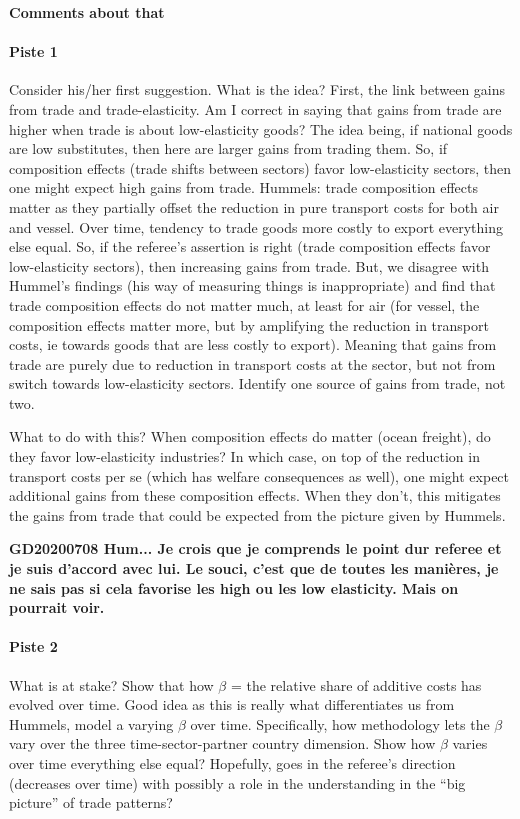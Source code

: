 \documentclass[a4paper,12pt]{article}
\begin{document}
\textbf{Comments about that}

\paragraph{Piste 1} Consider his/her first suggestion. What is the idea? First, the link between gains from trade and trade-elasticity. Am I correct in saying that gains from trade are higher when trade is about low-elasticity goods? The idea being, if national goods are low substitutes, then here are larger gains from trading them. So, if composition effects (trade shifts between sectors) favor low-elasticity sectors, then one might expect high gains from trade. Hummels: trade composition effects matter as they partially offset the reduction in pure transport costs for both air and vessel. Over time, tendency to trade goods more costly to export everything else equal. So, if the referee's assertion is right (trade composition effects favor low-elasticity sectors), then increasing gains from trade. But, we disagree with Hummel's findings (his way of measuring things is inappropriate) and find that trade composition effects do not matter much, at least for air (for vessel, the composition effects matter more, but by amplifying the reduction in transport costs, ie towards goods that are less costly to export). Meaning that gains from trade are purely due to reduction in transport costs at the sector, but not from switch towards low-elasticity sectors. Identify one source of gains from trade, not two.

What to do with this? When composition effects do matter (ocean freight), do they favor low-elasticity industries? In which case, on top of the reduction in transport costs per se (which has welfare consequences as well), one might expect additional gains from these composition effects. When they don't, this mitigates the gains from trade that could be expected from the picture given by Hummels. 

\textbf{GD20200708 Hum... Je crois que je comprends le point dur referee et je suis d’accord avec lui. Le souci, c’est que de toutes les manières, je ne sais pas si cela favorise les high ou les low elasticity. Mais on pourrait voir.}

\paragraph{Piste 2} What is at stake? Show that how $\beta$ = the relative share of additive costs has evolved over time. Good idea as this is really what differentiates us from Hummels, model a varying $\beta$ over time. Specifically, how methodology lets the $\beta$ vary over the three time-sector-partner country dimension. Show how $\beta$ varies over time everything else equal? Hopefully, goes in the referee's direction (decreases over time) with possibly a role in the understanding in the ``big picture'' of trade patterns?
\end{document}
